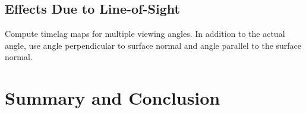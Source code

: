 \documentclass[modern,linenumbers]{aastex62}
\begin{document}
\subsection{Effects Due to Line-of-Sight}
Compute timelag maps for multiple viewing angles. In addition to the actual angle, use angle perpendicular to surface normal and angle parallel to the surface normal.

\section{Summary and Conclusion}
\label{conclusions}

\acknowledgments





\end{document}
